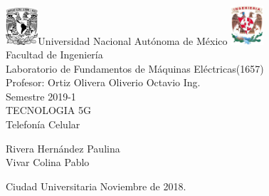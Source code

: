 

     \begin{center}
	\includegraphics[width=0.09\textwidth]{UNAM}\Large Universidad Nacional Autónoma de México
        	\includegraphics[width=0.09\textwidth]{FI}\\[2cm]
        \Large Facultad de Ingeniería\\[2cm]
      
         \Large Laboratorio de Fundamentos de Máquinas Eléctricas(1657)\\[2cm]
        \footnotesize Profesor: Ortiz Olivera Oliverio Octavio Ing.\\[1cm]
        \footnotesize Semestre 2019-1\\[1cm]
        
       

        \Large TECNOLOGIA 5G\\[2cm]
        
           

\Large Telefonía Celular
        
          \begin{flushright}
\footnotesize Rivera Hernández Paulina \\[0.5cm]
\footnotesize Vivar Colina Pablo\\[0.5cm]
 \end{flushright}
          \begin{flushleft}
        \footnotesize Ciudad Universitaria Noviembre de 2018.\\
          \end{flushleft}
         
          
   \end{center}
